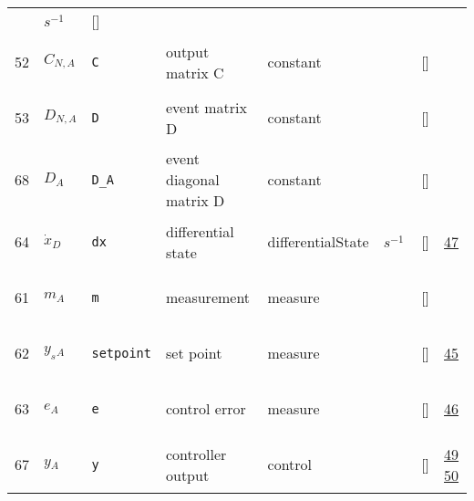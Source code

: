 \begin{longtable}{|p{1cm}|p{3cm}|p{3cm}|p{7cm}|p{3.0cm}|p{3cm}|p{2cm}|p{1cm}|}
             & $ s^{-1} \, $
             & []
             & \\
    52
             & \hypertarget{"v:52"}{ $ {C}{_{N, A}} $}
             & \verb|C|
             & output matrix C
             & \begin{lay}constant \end{lay}
             & $  $
             & []
             & \\
    53
             & \hypertarget{"v:53"}{ $ {D}{_{N, A}} $}
             & \verb|D|
             & event matrix D
             & \begin{lay}constant \end{lay}
             & $  $
             & []
             & \\
    68
             & \hypertarget{"v:68"}{ $ {D}{_{A}} $}
             & \verb|D_A|
             & event diagonal matrix D
             & \begin{lay}constant \end{lay}
             & $  $
             & []
             & \\
    64
             & \hypertarget{"v:64"}{ $ {{\dot{x}}}{_{D}} $}
             & \verb|dx|
             & differential state
             & \begin{lay}differentialState \end{lay}
             & $ s^{-1} \, $
             & []
             & \hyperlink{"e:47"}{ 47 }
                 \\
    61
             & \hypertarget{"v:61"}{ $ {m}{_{A}} $}
             & \verb|m|
             & measurement
             & \begin{lay}measure \end{lay}
             & $  $
             & []
             & \\
    62
             & \hypertarget{"v:62"}{ $ {{y_s}}{_{A}} $}
             & \verb|setpoint|
             & set point
             & \begin{lay}measure \end{lay}
             & $  $
             & []
             & \hyperlink{"e:45"}{ 45 }
                 \\
    63
             & \hypertarget{"v:63"}{ $ {e}{_{A}} $}
             & \verb|e|
             & control error
             & \begin{lay}measure \end{lay}
             & $  $
             & []
             & \hyperlink{"e:46"}{ 46 }
                 \\
    67
             & \hypertarget{"v:67"}{ $ {y}{_{A}} $}
             & \verb|y|
             & controller output
             & \begin{lay}control \end{lay}
             & $  $
             & []
             & \hyperlink{"e:49"}{ 49 }
                 \hyperlink{"e:50"}{ 50 }
                 \\
    \end{longtable}